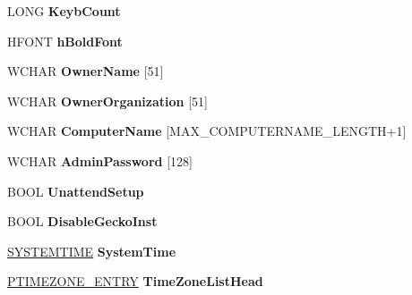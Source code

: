 \begin{DoxyCompactItemize}
\item 
\mbox{\label{struct___s_e_t_u_p_d_a_t_a_af93eae369051efed00a0ab68ee26f64c}} 
L\+O\+NG {\bfseries Keyb\+Count}
\item 
\mbox{\label{struct___s_e_t_u_p_d_a_t_a_a2d094e505adaa010f2f228fa954eca3d}} 
H\+F\+O\+NT {\bfseries h\+Bold\+Font}
\item 
\mbox{\label{struct___s_e_t_u_p_d_a_t_a_a707bc75cba8530fbd34dae20dc0f3e56}} 
W\+C\+H\+AR {\bfseries Owner\+Name} \mbox{[}51\mbox{]}
\item 
\mbox{\label{struct___s_e_t_u_p_d_a_t_a_ac104952dc857100a39e8a5201b7683de}} 
W\+C\+H\+AR {\bfseries Owner\+Organization} \mbox{[}51\mbox{]}
\item 
\mbox{\label{struct___s_e_t_u_p_d_a_t_a_a62e1bdf30afd681f5422bd4201b38640}} 
W\+C\+H\+AR {\bfseries Computer\+Name} \mbox{[}M\+A\+X\+\_\+\+C\+O\+M\+P\+U\+T\+E\+R\+N\+A\+M\+E\+\_\+\+L\+E\+N\+G\+TH+1\mbox{]}
\item 
\mbox{\label{struct___s_e_t_u_p_d_a_t_a_abf54e561a0cd5ca5414585e3dffda1cd}} 
W\+C\+H\+AR {\bfseries Admin\+Password} \mbox{[}128\mbox{]}
\item 
\mbox{\label{struct___s_e_t_u_p_d_a_t_a_abdec84a1fca5f2da2dcba113a3c688a0}} 
B\+O\+OL {\bfseries Unattend\+Setup}
\item 
\mbox{\label{struct___s_e_t_u_p_d_a_t_a_a0d4aeb209cd853488889772459e31bf2}} 
B\+O\+OL {\bfseries Disable\+Gecko\+Inst}
\item 
\mbox{\label{struct___s_e_t_u_p_d_a_t_a_ae3ff5ba03b0fe462593c1eea07014c36}} 
\hyperlink{struct___s_y_s_t_e_m_t_i_m_e}{S\+Y\+S\+T\+E\+M\+T\+I\+ME} {\bfseries System\+Time}
\item 
\mbox{\label{struct___s_e_t_u_p_d_a_t_a_aa05fc686e4a1e0240c5c6f4761301240}} 
\hyperlink{struct___t_i_m_e_z_o_n_e___e_n_t_r_y}{P\+T\+I\+M\+E\+Z\+O\+N\+E\+\_\+\+E\+N\+T\+RY} {\bfseries Time\+Zone\+List\+Head}

\end{DoxyCompactItemize}
